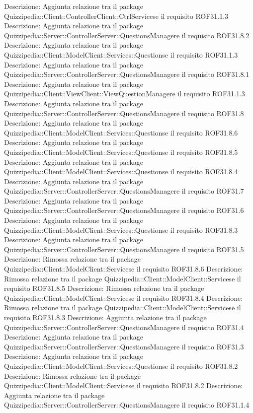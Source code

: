 Descrizione: Aggiunta relazione tra il package Quizzipedia::Client::ControllerClient::CtrlServicese il requisito ROF31.1.3 
Descrizione: Aggiunta relazione tra il package Quizzipedia::Server::ControllerServer::QuestionsManagere il requisito ROF31.8.2 
Descrizione: Aggiunta relazione tra il package Quizzipedia::Client::ModelClient::Services::Questionse il requisito ROF31.1.3 
Descrizione: Aggiunta relazione tra il package Quizzipedia::Server::ControllerServer::QuestionsManagere il requisito ROF31.8.1 
Descrizione: Aggiunta relazione tra il package Quizzipedia::Client::ViewClient::ViewQuestionManagere il requisito ROF31.1.3 
Descrizione: Aggiunta relazione tra il package Quizzipedia::Server::ControllerServer::QuestionsManagere il requisito ROF31.8 
Descrizione: Aggiunta relazione tra il package Quizzipedia::Client::ModelClient::Services::Questionse il requisito ROF31.8.6 
Descrizione: Aggiunta relazione tra il package Quizzipedia::Client::ModelClient::Services::Questionse il requisito ROF31.8.5 
Descrizione: Aggiunta relazione tra il package Quizzipedia::Client::ModelClient::Services::Questionse il requisito ROF31.8.4 
Descrizione: Aggiunta relazione tra il package Quizzipedia::Server::ControllerServer::QuestionsManagere il requisito ROF31.7 
Descrizione: Aggiunta relazione tra il package Quizzipedia::Server::ControllerServer::QuestionsManagere il requisito ROF31.6 
Descrizione: Aggiunta relazione tra il package Quizzipedia::Client::ModelClient::Services::Questionse il requisito ROF31.8.3 
Descrizione: Aggiunta relazione tra il package Quizzipedia::Server::ControllerServer::QuestionsManagere il requisito ROF31.5 
Descrizione: Rimossa relazione tra il package Quizzipedia::Client::ModelClient::Servicese il requisito ROF31.8.6 
Descrizione: Rimossa relazione tra il package Quizzipedia::Client::ModelClient::Servicese il requisito ROF31.8.5 
Descrizione: Rimossa relazione tra il package Quizzipedia::Client::ModelClient::Servicese il requisito ROF31.8.4 
Descrizione: Rimossa relazione tra il package Quizzipedia::Client::ModelClient::Servicese il requisito ROF31.8.3 
Descrizione: Aggiunta relazione tra il package Quizzipedia::Server::ControllerServer::QuestionsManagere il requisito ROF31.4 
Descrizione: Aggiunta relazione tra il package Quizzipedia::Server::ControllerServer::QuestionsManagere il requisito ROF31.3 
Descrizione: Aggiunta relazione tra il package Quizzipedia::Client::ModelClient::Services::Questionse il requisito ROF31.8.2 
Descrizione: Rimossa relazione tra il package Quizzipedia::Client::ModelClient::Servicese il requisito ROF31.8.2 
Descrizione: Aggiunta relazione tra il package Quizzipedia::Server::ControllerServer::QuestionsManagere il requisito ROF31.1.4 
